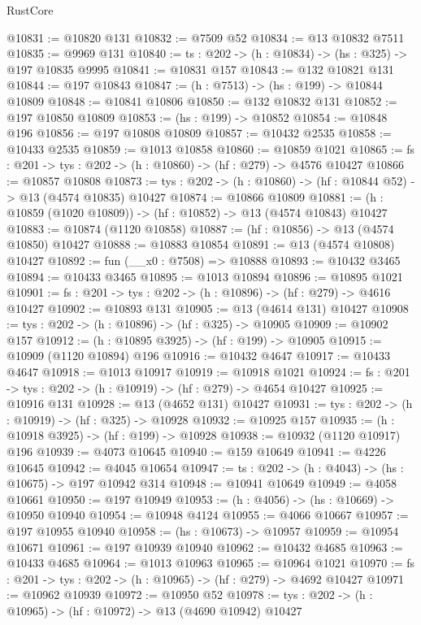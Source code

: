 \begin{lexlean}{RustCore}
\begin{coremodule}
@10831 := @10820 @131
@10832 := @7509 @52
@10834 := @13 @10832 @7511
@10835 := @9969 @131
@10840 := {ts : @202} -> (h : @10834) -> (hs : @325) -> @197 @10835 @9995
@10841 := @10831 @157
@10843 := @132 @10821 @131
@10844 := @197 @10843
@10847 := (h : @7513) -> (hs : @199) -> @10844 @10809
@10848 := @10841 @10806
@10850 := @132 @10832 @131
@10852 := @197 @10850 @10809
@10853 := (hs : @199) -> @10852
@10854 := @10848 @196
@10856 := @197 @10808 @10809
@10857 := @10432 @2535
@10858 := @10433 @2535
@10859 := @1013 @10858
@10860 := @10859 @1021
@10865 := {fs : @201} -> {tys : @202} -> (h : @10860) -> (hf : @279) -> @4576 @10427
@10866 := @10857 @10808
@10873 := {tys : @202} -> (h : @10860) -> (hf : @10844 @52) -> @13 (@4574 @10835) @10427
@10874 := @10866 @10809
@10881 := (h : @10859 (@1020 @10809)) -> (hf : @10852) -> @13 (@4574 @10843) @10427
@10883 := @10874 (@1120 @10858)
@10887 := (hf : @10856) -> @13 (@4574 @10850) @10427
@10888 := @10883 @10854
@10891 := @13 (@4574 @10808) @10427
@10892 := fun (__x0 : @7508) => @10888
@10893 := @10432 @3465
@10894 := @10433 @3465
@10895 := @1013 @10894
@10896 := @10895 @1021
@10901 := {fs : @201} -> {tys : @202} -> (h : @10896) -> (hf : @279) -> @4616 @10427
@10902 := @10893 @131
@10905 := @13 (@4614 @131) @10427
@10908 := {tys : @202} -> (h : @10896) -> (hf : @325) -> @10905
@10909 := @10902 @157
@10912 := (h : @10895 @3925) -> (hf : @199) -> @10905
@10915 := @10909 (@1120 @10894) @196
@10916 := @10432 @4647
@10917 := @10433 @4647
@10918 := @1013 @10917
@10919 := @10918 @1021
@10924 := {fs : @201} -> {tys : @202} -> (h : @10919) -> (hf : @279) -> @4654 @10427
@10925 := @10916 @131
@10928 := @13 (@4652 @131) @10427
@10931 := {tys : @202} -> (h : @10919) -> (hf : @325) -> @10928
@10932 := @10925 @157
@10935 := (h : @10918 @3925) -> (hf : @199) -> @10928
@10938 := @10932 (@1120 @10917) @196
@10939 := @4073 @10645
@10940 := @159 @10649
@10941 := @4226 @10645
@10942 := @4045 @10654
@10947 := {ts : @202} -> (h : @4043) -> (hs : @10675) -> @197 @10942 @314
@10948 := @10941 @10649
@10949 := @4058 @10661
@10950 := @197 @10949
@10953 := (h : @4056) -> (hs : @10669) -> @10950 @10940
@10954 := @10948 @4124
@10955 := @4066 @10667
@10957 := @197 @10955 @10940
@10958 := (hs : @10673) -> @10957
@10959 := @10954 @10671
@10961 := @197 @10939 @10940
@10962 := @10432 @4685
@10963 := @10433 @4685
@10964 := @1013 @10963
@10965 := @10964 @1021
@10970 := {fs : @201} -> {tys : @202} -> (h : @10965) -> (hf : @279) -> @4692 @10427
@10971 := @10962 @10939
@10972 := @10950 @52
@10978 := {tys : @202} -> (h : @10965) -> (hf : @10972) -> @13 (@4690 @10942) @10427

\end{coremodule}
\end{lexlean}
